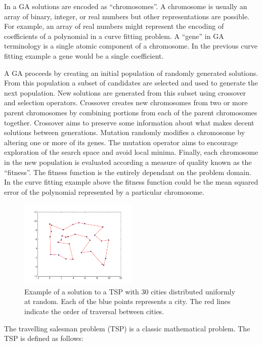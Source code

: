\documentclass[journal]{IEEEtran}
\begin{document}
In a GA solutions are encoded as “chromosomes”. A chromosome is usually an array of binary, integer, or real numbers but other representations are possible. For example, an array of real numbers might represent the encoding of coefficients of a polynomial in a curve fitting problem. A ``gene'' in GA terminology is a single atomic component of a chromosome. In the previous curve fitting example a gene would be a single coefficient.

A GA proceeds by creating an initial population of randomly generated solutions. From this population a subset of candidates are selected and used to generate the next population. New solutions are generated from this subset using crossover and selection operators. Crossover creates new chromosomes from two or more parent chromosomes by combining portions from each of the parent chromosomes together. Crossover aims to preserve some information about what makes decent solutions between generations. Mutation randomly modifies a chromosome by altering one or more of its genes. The mutation operator aims to encourage exploration of the search space and avoid local minima. Finally, each chromosome in the new population is evaluated according a measure of quality known as the ``fitness''. The fitness function is the entirely dependant on the problem domain. In the curve fitting example above the fitness function could be the mean squared error of the polynomial represented by a particular chromosome.

\begin{figure}[H]
\centering
\includegraphics[width=0.5\textwidth]{img/tsp_solution_example.png}
\caption{Example of a solution to a TSP with 30 cities distributed uniformly at random. Each of the blue points represents a city. The red lines indicate the order of traversal between cities.}
\label{fig:tsp-example}
\end{figure}

The travelling salesman problem (TSP) is a classic mathematical problem. The TSP is defined as follows:
\end{document}
